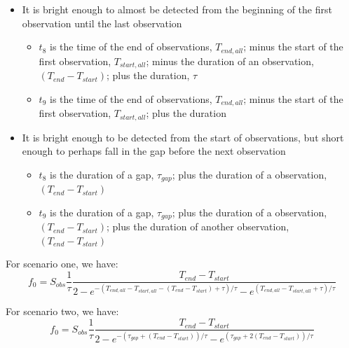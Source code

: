 \documentclass{article}
\begin{document}
\begin{itemize}
	\item It is bright enough to almost be detected from the beginning of the first observation until the last observation \begin{itemize}
		\item $t_8$ is the time of the end of observations, $T_{end, all}$; minus the start of the first observation, $T_{start, all}$; minus the duration of an observation, $(T_{end}-T_{start})$; plus the duration, $\tau$
		\item $t_9$ is the time of the end of observations,  $T_{end, all}$; minus the start of the first observation, $T_{start, all}$; plus the duration
	\end{itemize}
	\item It is bright enough to be detected from the start of observations, but short enough to perhaps fall in the gap before the next observation\begin{itemize}
		\item $t_8$ is the duration of a gap, $\tau_{gap}$; plus the duration of a observation, $(T_{end}-T_{start})$
		\item $t_9$ is the duration of a gap, $\tau_{gap}$; plus the duration of a observation, $(T_{end}-T_{start})$; plus the duration of another observation, $(T_{end}-T_{start})$
	\end{itemize} 
\end{itemize}

For scenario one, we have:
\[f_0 = S_{obs}\frac{1}{\tau}\frac{T_{end}-T_{start}}{ 2-e^{-(T_{end, all}-T_{start, all}-(T_{end}-T_{start})+ \tau )/\tau}-e^{(T_{end, all} - T_{start, all} + \tau)/\tau}}  \]

For scenario two, we have:
\[f_0 = S_{obs}\frac{1}{\tau}\frac{T_{end}-T_{start}}{ 2-e^{-(\tau_{gap} + (T_{end}-T_{start}))/\tau}-e^{(\tau_{gap} + 2(T_{end}-T_{start}))/\tau}}  \]
\end{document}
